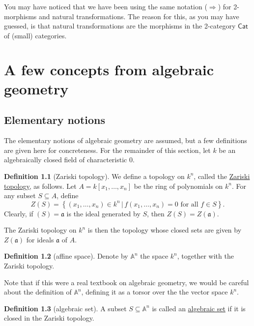 \documentclass[a4paper,10pt]{scrreprt}
\newcommand{\defn}[1]{\ul{#1}}
\theoremstyle{definition}
\newtheorem{definition}{Definition}[section]
\theoremstyle{plain}
\theoremstyle{remark}
\begin{document}
You may have noticed that we have been using the same notation ($\Rightarrow$) for 2-morphisms and natural transformations. The reason for this, as you may have guessed, is that natural transformations are the morphisms in the 2-category $\mathsf{Cat}$ of (small) categories.

\chapter{A few concepts from algebraic geometry}
\section{Elementary notions}
The elementary notions of algebraic geometry are assumed, but a few definitions are given here for concreteness. For the remainder of this section, let $k$ be an algebraically closed field of characteristic $0$.
\begin{definition}[Zariski topology]
  \label{def:zariskitopology}
  We define a topology on $k^{n}$, called the \defn{Zariski topology}, as follows. Let $A = k[x_{1},\dots,x_{n}]$ be the ring of polynomials on $k^{n}$. For any subset $S \subseteq A$, define
  \begin{equation*}
    Z(S) = \left\{ (x_{1},\dots,x_{n}) \in k^{n}\,\Big|\, f(x_{1},\dots,x_{n}) = 0\text{ for all }f \in S \right\}.
  \end{equation*}
  Clearly, if $(S) = \mathfrak{a}$ is the ideal generated by $S$, then $Z(S) = Z(\mathfrak{a})$.

  The Zariski topology on $k^{n}$ is then the topology whose closed sets are given by $Z(\mathfrak{a})$ for ideals $\mathfrak{a}$ of $A$.
\end{definition}

\begin{definition}[affine space]
  \label{def:affinespace}
  Denote by $\mathbb{A}^{n}$ the space $k^{n}$, together with the Zariski topology. 

  Note that if this were a real textbook on algebraic geometry, we would be careful about the definition of $\mathbb{A}^{n}$, defining it as a torsor over the the vector space $k^{n}$.
\end{definition} 

\begin{definition}[algebraic set]
  \label{def:algebraicset}
  A subset $S \subseteq \mathbb{A}^{n}$ is called an \defn{algebraic set} if it is closed in the Zariski topology.
\end{definition}
\end{document}
